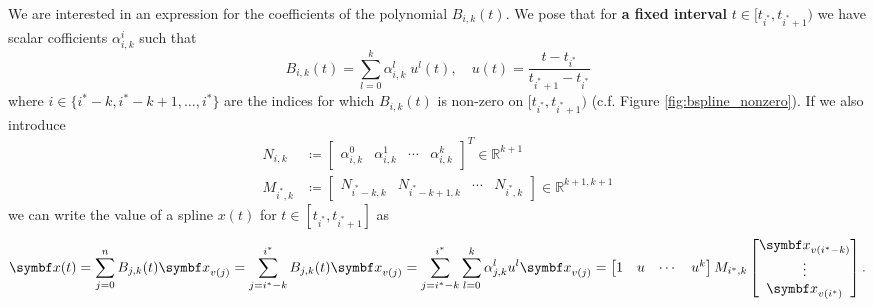 We are interested in an expression for the coefficients of the polynomial $B_{i, k}(t)$. We pose that for \textbf{a fixed interval} $t \in [t_{i^*}, t_{i^*+1})$ we have scalar cofficients $\alpha^i_{i,k}$ such that
\begin{equation}
  \label{eq:basis_expression}
  B_{i, k}(t) = \sum_{l=0}^k \alpha^{l}_{i, k} \; u^l(t), \quad u(t) = \frac{t - t_{i^*}}{t_{i^*+1} - t_{i^*}}
\end{equation}
where $i \in \{ i^* - k, i^* - k + 1, \ldots, i^* \}$ are the indices for which $B_{i, k}(t)$ is non-zero on $[t_{i^*}, t_{i^*+1})$ (c.f. Figure \ref{fig:bspline_nonzero}). If we also introduce
\begin{equation}
  \label{eq:coeff_matrix_forms}
  \begin{aligned}
    N_{i, k}   & \coloneq \begin{bmatrix} \alpha_{i,k}^0 & \alpha_{i, k}^1 & \cdots & \alpha_{i, k}^k \end{bmatrix}^T \in \mathbb{R}^{k+1}    \\
    M_{i^*, k} & \coloneq \begin{bmatrix}
      N_{i^*-k, k} & N_{i^*-k+1, k} & \cdots & N_{i^*, k}
    \end{bmatrix} \in \mathbb{R}^{k+1, k+1}
  \end{aligned}
\end{equation}
we can write the value of a spline $x(t)$ for $t \in [t_{i^*}, t_{i^*+1}]$ as
\begin{equation}
  \begin{aligned}
    \x(t) = \sum_{j = 0}^n B_{j,k}(t) \x_{v(j)} = \sum_{j = i^*-k}^{i^*} B_{j,k}(t) \x_{v(j)} = \sum_{j = i^*-k}^{i^*} \sum_{l=0}^k \alpha_{j, k}^l u^l \x_{v(j)} =  \begin{bmatrix} 1 & u & \cdots & u^k \end{bmatrix} M_{i^*, k} \begin{bmatrix} \x_{v(i^* - k)} \\ \vdots \\ \x_{v(i^*)} \end{bmatrix}.
  \end{aligned}
\end{equation}


